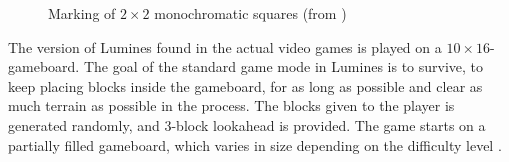 \begin{figure}[H]
    \centering
    \caption{Marking of $2 \times 2$ monochromatic squares (from \cite{lumines})}
\end{figure}

The version of Lumines found in the actual video games is played on a $10 \times 16$-gameboard. The goal of the standard game mode in Lumines is to survive, to keep placing blocks inside the gameboard, for as long as possible and clear as much terrain as possible in the process. The blocks given to the player is generated randomly, and 3-block lookahead is provided. The game starts on a partially filled gameboard, which varies in size depending on the difficulty level \cite{lumines}.

